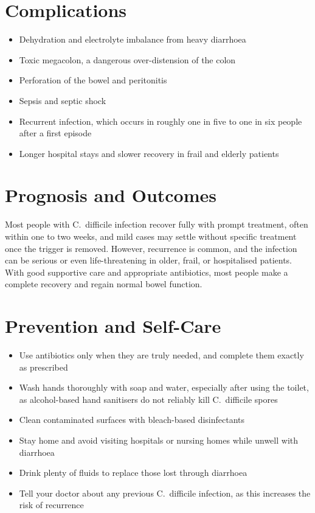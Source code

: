 \section*{Complications}
\begin{itemize}
    \item Dehydration and electrolyte imbalance from heavy diarrhoea
    \item Toxic megacolon, a dangerous over-distension of the colon
    \item Perforation of the bowel and peritonitis
    \item Sepsis and septic shock
    \item Recurrent infection, which occurs in roughly one in five to one in six people after a first episode
    \item Longer hospital stays and slower recovery in frail and elderly patients
\end{itemize}

\section*{Prognosis and Outcomes}
Most people with C.\ difficile infection recover fully with prompt treatment, often within one to two weeks, and mild cases may settle without specific treatment once the trigger is removed. However, recurrence is common, and the infection can be serious or even life-threatening in older, frail, or hospitalised patients. With good supportive care and appropriate antibiotics, most people make a complete recovery and regain normal bowel function.

\section*{Prevention and Self-Care}
\begin{itemize}
    \item Use antibiotics only when they are truly needed, and complete them exactly as prescribed
    \item Wash hands thoroughly with soap and water, especially after using the toilet, as alcohol-based hand sanitisers do not reliably kill C.\ difficile spores
    \item Clean contaminated surfaces with bleach-based disinfectants
    \item Stay home and avoid visiting hospitals or nursing homes while unwell with diarrhoea
    \item Drink plenty of fluids to replace those lost through diarrhoea
    \item Tell your doctor about any previous C.\ difficile infection, as this increases the risk of recurrence
\end{itemize}

